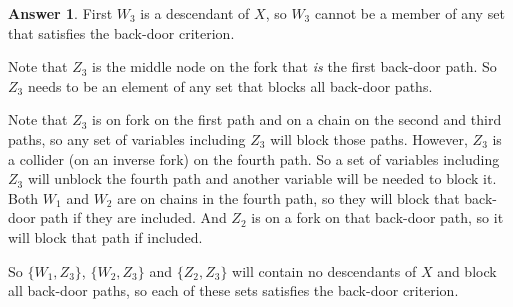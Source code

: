 \documentclass[11pt]{amsart}
\theoremstyle{definition}
\newtheorem{answer}{Answer}
\theoremstyle{question}
\begin{document}
\begin{answer}
First $W_3$ is a descendant of $X$, so $W_3$ cannot be a member of any set that satisfies the back-door criterion.

Note that $Z_3$ is the middle node on the fork that \emph{is} the first back-door path.
So $Z_3$ needs to be an element of any set that blocks all back-door paths.

Note that $Z_3$ is on fork on the first path and on a chain on the second and third paths, so any set of variables including $Z_3$ will block those paths.
However, $Z_3$ is a collider (on an inverse fork) on the fourth path. 
So a set of variables including $Z_3$ will unblock the fourth path and another variable will be needed to block it.
Both $W_1$ and $W_2$ are on chains in the fourth path, so they will block that back-door path if they are included.
And $Z_2$ is on a fork on that back-door path, so it will block that path if included.

So  $\{ W_1, Z_3 \}$, $\{ W_2, Z_3 \}$ and $\{ Z_2, Z_3 \}$ will contain no descendants of $X$ and block all back-door paths, so each of these sets satisfies the back-door criterion.
\end{answer}


\end{document}
